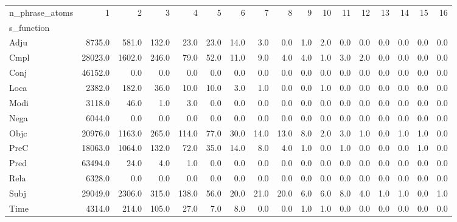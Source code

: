 \begin{tabular}{lrrrrrrrrrrrrrrrr}
\toprule
n\_phrase\_atoms &       1  &      2  &     3  &     4  &    5  &    6  &    7  &    8  &   9  &   10 &   11 &   12 &   13 &   14 &   15 &   16 \\
s\_function &          &         &        &        &       &       &       &       &      &      &      &      &      &      &      &      \\
\midrule
Adju       &   8735.0 &   581.0 &  132.0 &   23.0 &  23.0 &  14.0 &   3.0 &   0.0 &  1.0 &  2.0 &  0.0 &  0.0 &  0.0 &  0.0 &  0.0 &  0.0 \\
Cmpl       &  28023.0 &  1602.0 &  246.0 &   79.0 &  52.0 &  11.0 &   9.0 &   4.0 &  4.0 &  1.0 &  3.0 &  2.0 &  0.0 &  0.0 &  0.0 &  0.0 \\
Conj       &  46152.0 &     0.0 &    0.0 &    0.0 &   0.0 &   0.0 &   0.0 &   0.0 &  0.0 &  0.0 &  0.0 &  0.0 &  0.0 &  0.0 &  0.0 &  0.0 \\
Loca       &   2382.0 &   182.0 &   36.0 &   10.0 &  10.0 &   3.0 &   1.0 &   0.0 &  0.0 &  1.0 &  0.0 &  0.0 &  0.0 &  0.0 &  0.0 &  0.0 \\
Modi       &   3118.0 &    46.0 &    1.0 &    3.0 &   0.0 &   0.0 &   0.0 &   0.0 &  0.0 &  0.0 &  0.0 &  0.0 &  0.0 &  0.0 &  0.0 &  0.0 \\
Nega       &   6044.0 &     0.0 &    0.0 &    0.0 &   0.0 &   0.0 &   0.0 &   0.0 &  0.0 &  0.0 &  0.0 &  0.0 &  0.0 &  0.0 &  0.0 &  0.0 \\
Objc       &  20976.0 &  1163.0 &  265.0 &  114.0 &  77.0 &  30.0 &  14.0 &  13.0 &  8.0 &  2.0 &  3.0 &  1.0 &  0.0 &  1.0 &  1.0 &  0.0 \\
PreC       &  18063.0 &  1064.0 &  132.0 &   72.0 &  35.0 &  14.0 &   8.0 &   4.0 &  1.0 &  0.0 &  1.0 &  0.0 &  0.0 &  0.0 &  1.0 &  0.0 \\
Pred       &  63494.0 &    24.0 &    4.0 &    1.0 &   0.0 &   0.0 &   0.0 &   0.0 &  0.0 &  0.0 &  0.0 &  0.0 &  0.0 &  0.0 &  0.0 &  0.0 \\
Rela       &   6328.0 &     0.0 &    0.0 &    0.0 &   0.0 &   0.0 &   0.0 &   0.0 &  0.0 &  0.0 &  0.0 &  0.0 &  0.0 &  0.0 &  0.0 &  0.0 \\
Subj       &  29049.0 &  2306.0 &  315.0 &  138.0 &  56.0 &  20.0 &  21.0 &  20.0 &  6.0 &  6.0 &  8.0 &  4.0 &  1.0 &  1.0 &  0.0 &  1.0 \\
Time       &   4314.0 &   214.0 &  105.0 &   27.0 &   7.0 &   8.0 &   0.0 &   0.0 &  1.0 &  1.0 &  0.0 &  0.0 &  0.0 &  0.0 &  0.0 &  0.0 \\
\bottomrule
\end{tabular}
